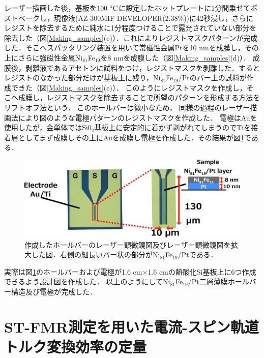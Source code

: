 レーザー描画した後，基板を$100\rm\ ^{\circ}C$に設定したホットプレートに1分間乗せてポストベークし，現像液(AZ 300MIF DEVELOPER(2.38\%))に42秒浸し，さらにレジストを除去するために純水に1分程度つけることで露光されていない部分を除去した（図\ref{Making_samples}(c)）．これによりレジストマスクパターンが完成した．そこへスパッタリング装置を用いて常磁性金属Ptを10 nmを成膜し，その上にさらに強磁性金属Ni$_{81}$Fe$_{19}$を8 nmを成膜した（図\ref{Making_samples}(d)）．
成膜後，剥離液であるアセトンに試料をつけ，レジストマスクを剥離した．するとレジストのなかった部分だけが基板上に残り，Ni$_{81}$Fe$_{19}$/Ptのバー上の試料が作成できた（図\ref{Making_samples}(e)）．
このようにレジストマスクを作成し，そこへ成膜し，レジストマスクを除去することで所望のパターンを形成する方法をリフトオフ法という．
このホールバーは微小なため，
同様の過程のレーザー描画法により図のような電極パターンのレジストマスクを作成した．
電極はAuを使用したが，金単体ではSi0$_{2}$基板上に安定的に着かず剥がれてしまうのでTiを接着層としてまず成膜しその上にAuを成膜し電極を作成した．その結果が図\ref{madehallbar}である．

\begin{figure}[htbp]
 \begin{center}
  \includegraphics[width=150mm]{images/STFMRpicture.pdf}
 \end{center}
 \caption{作成したホールバーのレーザー顕微鏡図及びレーザー顕微鏡図を拡大した図．右側の細長いバー状の部分がNi$_{81}$Fe$_{19}$/Ptである．}
 \label{madehallbar}
\end{figure}

実際は図\ref{madehallbar}のホールバーおよび電極が1.6 cm$\times$1.6 cmの熱酸化Si基板上に6つ作成できるよう設計図を作成した．
以上のようにしてNi$_{81}$Fe$_{19}$/Pt二層薄膜ホールバー構造及び電極が完成した．


\section{ST-FMR測定を用いた電流-スピン軌道トルク変換効率の定量}\label{FMR_uniform}

